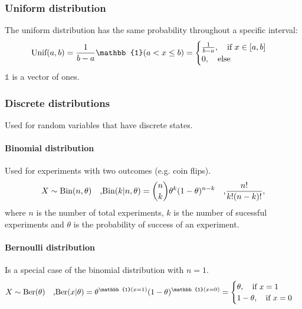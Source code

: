 \documentclass[../main.tex]{subfiles}
\begin{document}
    \subsubsection{Uniform distribution} 
            The uniform distribution has the same probability throughout a specific interval:
            \[ \text{Unif}(a,b) = \frac{1}{b-a} \mathbb{1}(a < x \leq b) = \begin{cases} 
                \frac{1}{b-a}, \text{\hspace{1em}if } x \in [ a,b ] \\
                0, \text{\hspace{1em}else}
            \end{cases}
            \]
            $\mathbb{1}$ is a vector of ones. 

    \subsubsection{Discrete distributions}
        Used for random variables that have discrete states.

        \paragraph{Binomial distribution}  Used for experiments with two outcomes (e.g. coin flips). 
                $$X \sim \text{Bin}(n, \theta ) \text{\hspace{1em},Bin}(k|n,\theta)={n \choose k} \theta^k (1-\theta)^{n-k} \text{\hspace{1em},}\frac{n!}{k!(n-k)!},$$ 
                where $n$ is the number of total experiments, $k$ is the number of sucessful experiments and $\theta$ is the probability of success of an experiment.

        \paragraph{Bernoulli distribution}  Is a special case of the binomial distribution with $n=1$. 
                $$X \sim \text{Ber}(\theta ) \text{\hspace{1em},Ber}(x | \theta)=\theta^{\mathbb{1}(x=1)} (1-\theta)^{\mathbb{1}(x=0)}= \begin{cases}
                    \theta, \hspace{1em}\text{if } x=1 \\
                    1 - \theta, \hspace{1em}\text{if } x=0
                \end{cases} $$
\end{document}

